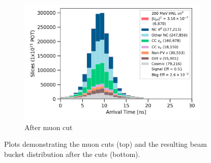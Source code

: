 \begin{figure}[t!]
\begin{subfigure}[b]{0.495\textwidth}
            \includegraphics[width=\textwidth]{beam_bucket_postmuon}
            \caption{After muon cut}%
            \label{fig:bb_post_muon}
        \end{subfigure}
        \caption{
		Plots demonstrating the muon cuts (top) and the resulting beam bucket distribution after the cuts (bottom). 
	}
        \label{fig:razzled_muon_cut}
\end{figure}


